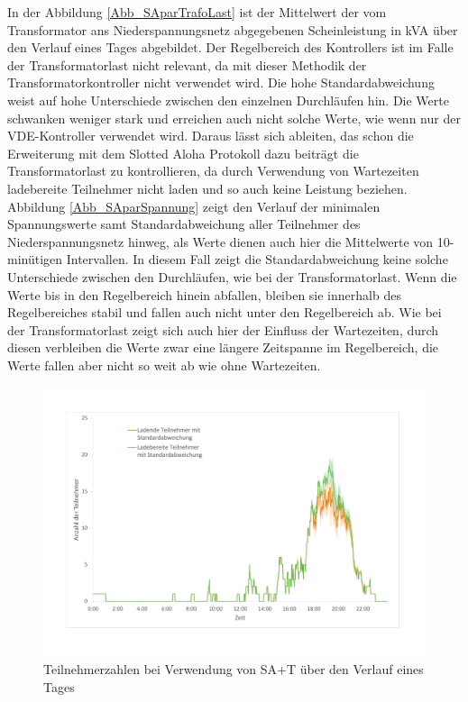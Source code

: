 In der Abbildung \ref{Abb_SAparTrafoLast} ist der Mittelwert der vom Transformator ans Niederspannungsnetz abgegebenen Scheinleistung in kVA über den Verlauf eines Tages abgebildet. Der Regelbereich des Kontrollers ist im Falle der Transformatorlast nicht relevant, da mit dieser Methodik der Transformatorkontroller nicht verwendet wird. Die hohe Standardabweichung weist auf hohe Unterschiede zwischen den einzelnen Durchläufen hin. Die Werte schwanken weniger stark und erreichen auch nicht solche Werte, wie wenn nur der VDE-Kontroller verwendet wird. Daraus lässt sich ableiten, das schon die Erweiterung mit dem Slotted Aloha Protokoll dazu beiträgt die Transformatorlast zu kontrollieren, da durch Verwendung von Wartezeiten ladebereite Teilnehmer nicht laden und so auch keine Leistung beziehen. \\
Abbildung \ref{Abb_SAparSpannung} zeigt den Verlauf der minimalen Spannungswerte samt Standardabweichung aller Teilnehmer des Niederspannungsnetz hinweg, als Werte dienen auch hier die Mittelwerte von 10-minütigen Intervallen. In diesem Fall zeigt die Standardabweichung keine solche Unterschiede zwischen den Durchläufen, wie bei der Transformatorlast. Wenn die Werte bis in den Regelbereich hinein abfallen, bleiben sie innerhalb des Regelbereiches stabil und fallen auch nicht unter den Regelbereich ab. Wie bei der Transformatorlast zeigt sich auch hier der Einfluss der Wartezeiten, durch diesen verbleiben die Werte zwar eine längere Zeitspanne im Regelbereich, die Werte fallen aber nicht so weit ab wie ohne Wartezeiten.
\begin{figure}[htb]
\centering
	\includegraphics[scale=0.45]{img/SA_par/Teilnehmer2.pdf}
	\caption{Teilnehmerzahlen bei Verwendung von SA+T über den Verlauf eines Tages}
	\label{Abb_SAparTeilnehmer}
\end{figure}

